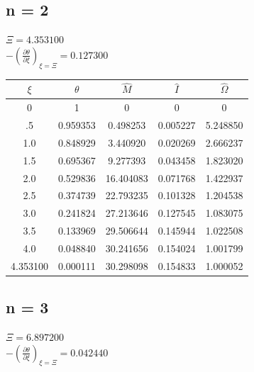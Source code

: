 \documentclass[11pt]{article} %
\newcommand{\pder}[2][]{\frac{\partial#1}{\partial#2}}
\begin{document}
\subsection*{n = 2}

$\Xi = 4.353100$ \\
$-\left(\pder[\theta]{\xi}\right)_{\xi = \Xi} =0.127300$\\

\begin{tabular}{| c | c c c c |}
\hline
$\xi$ & $\theta$ & $\hat{M}$ &  $\hat{I}$  & $\hat{\Omega}$ \\
\hline
0 & 1 & 0 & 0 & 0 \\
.5 & 0.959353 & 0.498253 & 0.005227 & 5.248850\\
1.0 & 0.848929 & 3.440920 &0.020269 & 2.666237\\
1.5 & 0.695367 & 9.277393 & 0.043458 & 1.823020\\
2.0 &0.529836 &16.404083 &0.071768 & 1.422937\\
2.5 & 0.374739 & 22.793235 &0.101328 & 1.204538\\
3.0 & 0.241824 &27.213646 & 0.127545 & 1.083075\\
3.5 & 0.133969 &29.506644 & 0.145944 & 1.022508\\
4.0 & 0.048840 &30.241656 &0.154024 & 1.001799\\
4.353100 & 0.000111 & 30.298098 & 0.154833 & 1.000052\\
\hline
\end{tabular}

\subsection*{n = 3}

$\Xi = 6.897200$ \\
$-\left(\pder[\theta]{\xi}\right)_{\xi = \Xi} =0.042440$\\
\end{document}
